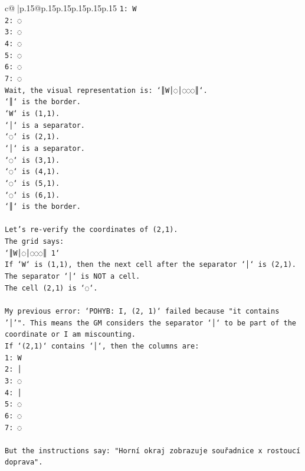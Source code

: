 \documentclass{article}
\begin{document}
{\begin{supertabular}{c@{$\;$}|p{.15\linewidth}@{}p{.15\linewidth}p{.15\linewidth}p{.15\linewidth}p{.15\linewidth}p{.15\linewidth}}
{{{\texttt{1: W} \\
\texttt{2: ◌} \\
\texttt{3: ◌} \\
\texttt{4: ◌} \\
\texttt{5: ◌} \\
\texttt{6: ◌} \\
\texttt{7: ◌} \\
\texttt{Wait, the visual representation is: `║W│◌│◌◌◌║`.} \\
\texttt{`║` is the border.} \\
\texttt{`W` is (1,1).} \\
\texttt{`│` is a separator.} \\
\texttt{`◌` is (2,1).} \\
\texttt{`│` is a separator.} \\
\texttt{`◌` is (3,1).} \\
\texttt{`◌` is (4,1).} \\
\texttt{`◌` is (5,1).} \\
\texttt{`◌` is (6,1).} \\
\texttt{`║` is the border.} \\
\\ 
\texttt{Let's re{-}verify the coordinates of (2,1).} \\
\texttt{The grid says:} \\
\texttt{`║W│◌│◌◌◌║ 1`} \\
\texttt{If `W` is (1,1), then the next cell after the separator `│` is (2,1).} \\
\texttt{The separator `│` is NOT a cell.} \\
\texttt{The cell (2,1) is `◌`.} \\
\\ 
\texttt{My previous error: `POHYB: I, (2, 1)` failed because "it contains '│'". This means the GM considers the separator `│` to be part of the coordinate or I am miscounting.} \\
\texttt{If `(2,1)` contains `│`, then the columns are:} \\
\texttt{1: W} \\
\texttt{2: │} \\
\texttt{3: ◌} \\
\texttt{4: │} \\
\texttt{5: ◌} \\
\texttt{6: ◌} \\
\texttt{7: ◌} \\
\\ 
\texttt{But the instructions say: "Horní okraj zobrazuje souřadnice x rostoucí doprava".} \\
}}}
\end{supertabular}}
\end{document}
